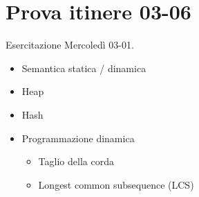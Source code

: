 \documentclass{article}
\begin{document}
\pagebreak

\section*{Prova itinere 03-06}
Esercitazione Mercoledì 03-01.
\begin{itemize}
  \item Semantica statica / dinamica
  \item Heap
  \item Hash
  \item Programmazione dinamica
        \begin{itemize}
          \item Taglio della corda
          \item Longest common subsequence (LCS)
        \end{itemize}
\end{itemize}
\end{document}
